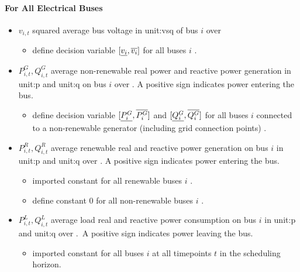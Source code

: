 \paragraph{For All Electrical Buses}
\begin{itemize}

\item $v_{i,t}$ squared average bus voltage in \gls{unit:vsq} of bus $i$
over \intervaloft{}

\begin{itemize} \item \gls{define} decision variable
      $[\underline{v_i}, \overline{v_i}]$ for all buses $i$ \atallt{}. \end{itemize}

\item $P^G_{i,t}, Q^G_{i,t}$ average non-renewable real power and reactive power
  generation in \gls{unit:p} and \gls{unit:q} on bus $i$ over \intervaloft{}.  A
  positive sign indicates power entering the bus.

\begin{itemize} \item \gls{define}
  decision variable $[\underline{P^G_i}, \overline{P^G_i}]$ and $[\underline{Q^G_i}, \overline{Q^G_i}]$
  for all buses $i$ connected to a non-renewable generator (including grid
  connection points) \atallt{}.  \end{itemize}

\item $P^R_{i,t}, Q^R_{i,t}$ average renewable real and reactive power
  generation on bus $i$ in \gls{unit:p} and \gls{unit:q} over \intervaloft{}. A
  positive sign indicates power entering the bus.

\begin{itemize}

\item \gls{imported} constant for all renewable buses $i$ \atallt{}.

\item \gls{define}  constant 0 for all non-renewable buses $i$ \atallt{}.

\end{itemize}

\item $P^L_{i,t}, Q^L_{i,t}$ average load real and reactive power consumption on
  bus $i$ in \gls{unit:p} and \gls{unit:q} over \intervaloft{}.\ A positive sign
  indicates power leaving the bus.

\begin{itemize}

\item \gls{imported} constant for all buses $i$ at all timepoints $t$ in the
  scheduling horizon.  \end{itemize}


\end{itemize}

